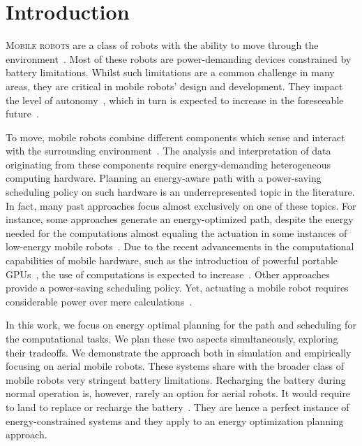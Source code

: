 
\chapter{Introduction}
\label{cp:intro}


\lettrine{M}{obile robots} are a class of robots with the ability to move through the environment~\citep{corke2017robotics}. Most of these robots are power-demanding devices constrained by battery limitations. Whilst such limitations are a common challenge in many areas, they are critical in mobile robots' design and development. They impact the level of autonomy~\citep{seewald2020mechanical}, which in turn is expected to increase in the foreseeable future~\citep{fisher2013verifying}.

To move, mobile robots combine different components which sense and interact with the surrounding environment~\citep{mei2006deployment}. The analysis and interpretation of data originating from these components require energy-demanding heterogeneous computing hardware. Planning an energy-aware path with a power-saving scheduling policy on such hardware is an underrepresented topic in the literature. In fact, many past approaches focus almost exclusively on one of these topics. For instance, some approaches generate an energy-optimized path, despite the energy needed for the computations almost equaling the actuation in some instances of low-energy mobile robots~\citep{sudhakar2020balancing}. Due to the recent advancements in the computational capabilities of mobile hardware, such as the introduction of powerful portable GPUs~\citep{rizvi2017general}, the use of computations is expected to increase~\citep{abramov2012real,satria2016real,jaramillo2019visual}. Other approaches provide a power-saving scheduling policy. Yet, actuating a mobile robot requires considerable power over mere calculations~\citep{mei2004energy,mei2005case}.

In this work, we focus on energy optimal planning for the path and scheduling for the computational tasks. We plan these two aspects simultaneously, exploring their tradeoffs. We demonstrate the approach both in simulation and empirically focusing on aerial mobile robots. These systems share with the broader class of mobile robots very stringent battery limitations. Recharging the battery during normal operation is, however, rarely an option for aerial robots. It would require to land to replace or recharge the battery~\citep{zamanakos2020energy}. They are hence a perfect instance of energy-constrained systems and they apply to an energy optimization planning approach.


